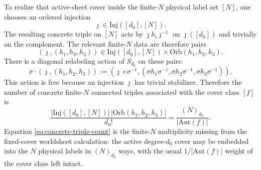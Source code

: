 \documentclass[11pt]{article}
\newcommand{\Aut}{\mathrm{Aut}}
\newcommand{\Inj}{\mathrm{Inj}}
\begin{document}
To realize that active-sheet cover inside the finite-$N$ physical label set $[N]$, one chooses an ordered injection
\[
\jmath\in \Inj([d_0],[N]).
\]
The resulting concrete triple on $[N]$ acts by $\jmath h_i\jmath^{-1}$ on $\jmath([d_0])$ and trivially on the complement. The relevant finite-$N$ data are therefore pairs
\[
(\jmath,(h_1,h_2,h_3))
\in
\Inj([d_0],[N])\times \mathrm{Orb}(h_1,h_2,h_3).
\]
There is a diagonal relabeling action of $S_{d_0}$ on these pairs:
\[
\sigma\cdot
(\jmath,(h_1,h_2,h_3))
:=
(\jmath\circ \sigma^{-1},(\sigma h_1\sigma^{-1},\sigma h_2\sigma^{-1},\sigma h_3\sigma^{-1})).
\]
This action is free because an injection $\jmath$ has trivial stabilizer. Therefore the number of concrete finite-$N$ connected triples associated with the cover class $[f]$ is
\begin{equation}\label{eq:concrete-triple-count}
\frac{
|\Inj([d_0],[N])|\,
|\mathrm{Orb}(h_1,h_2,h_3)|
}{
d_0!
}
=
\frac{(N)_{d_0}}{|\Aut(f)|}.
\end{equation}
Equation \eqref{eq:concrete-triple-count} is the finite-$N$ multiplicity missing from the fixed-cover worldsheet calculation: the active degree-$d_0$ cover may be embedded into the $N$ physical labels in $(N)_{d_0}$ ways, with the usual $1/|\Aut(f)|$ weight of the cover class left intact.
\end{document}
